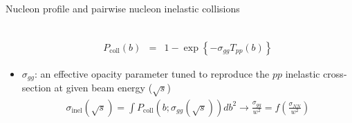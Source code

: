 \documentclass[11pt, aspectratio=169]{beamer}
\begin{document}
\begin{frame}{Nucleon profile and pairwise nucleon inelastic collisions}
\begin{columns}
\begin{column}[c]{.65\textwidth}
\begin{itemize}
\begin{eqnarray}
\\
\nonumber
P_{\textrm{coll}}(b) &=& 1-\exp\left\{  -\sigma_{gg} T_{pp}(b) \right\}
\end{eqnarray}
\item $\sigma_{gg}$: an effective opacity parameter tuned to reproduce the $pp$ inelastic cross-section at given beam energy ($\sqrt{s}$)
\begin{eqnarray}
\nonumber
\sigma_{\textrm{inel}}(\sqrt{s}) = \int P_{\textrm{coll}}(b; \sigma_{gg}(\sqrt{s})) db^2 \rightarrow \frac{\sigma_{gg}}{w^2} = f\left( \frac{\sigma_{NN}}{w^2}\right)
\end{eqnarray}
\end{itemize}
\end{column}
\end{columns}
\end{frame}
\end{document}
